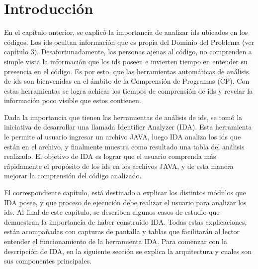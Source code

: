 \fancyhf{}
\pagestyle{fancy}
\lhead[]{\leftmark}
\chead[]{}
\rhead[]{\thepage}
\renewcommand{\headrulewidth}{1pt}

\section{Introducción}

En el capítulo anterior, se explicó la importancia de analizar ids ubicados en los códigos. Los ids ocultan información que es propia del Dominio del Problema (ver capítulo 3). Desafortunadamente, las personas ajenas al código, no comprenden a simple vista la información que los ids poseen e invierten tiempo en entender su presencia en el código. Es por esto, que las herramientas automáticas de análisis de ids son bienvenidas en el ámbito de la Comprensión de Programas (CP). Con estas herramientas se logra achicar los tiempos de comprensión de ids y revelar la información poco visible que estos contienen.

Dada la importancia que tienen las herramientas de análisis de ids, se tomó la iniciativa de desarrollar una llamada Identifier Analyzer (IDA). Esta herramienta le permite al usuario ingresar un archivo JAVA, luego IDA analiza los ids que están en el archivo, y finalmente muestra como resultado una tabla del análisis realizado.
El objetivo de IDA es lograr que el usuario comprenda más rápidamente el propósito de los ids en los archivos JAVA, y de esta manera mejorar la comprensión del código analizado.


El correspondiente capítulo, está destinado a explicar los distintos módulos que IDA posee, y que proceso de ejecución debe realizar el usuario para analizar los ids. Al final de este capítulo, se describen algunos casos de estudio que demuestran la importancia de haber construido IDA. Todas estas explicaciones, están acompañadas con capturas de pantalla y tablas que facilitarán al lector entender el funcionamiento de la herramienta IDA. 
Para comenzar con la descripción de IDA, en la siguiente sección se explica la arquitectura y cuales son sus componentes principales.



